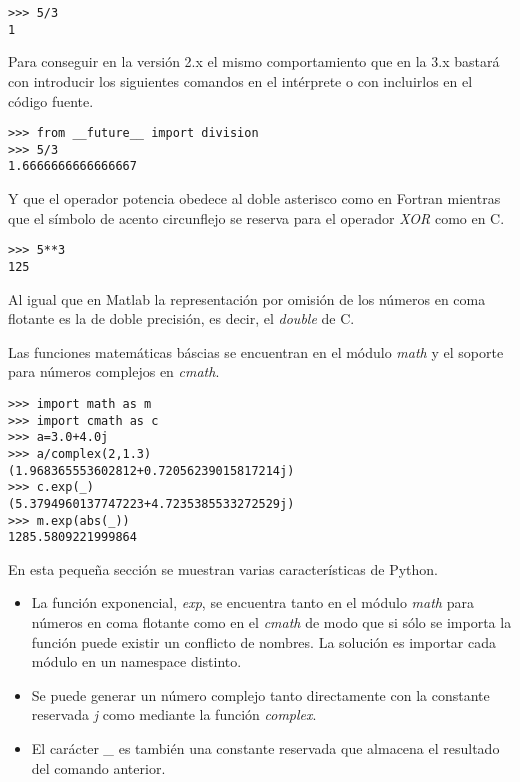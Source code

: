 \documentclass[a4paper,10pt]{article}
\begin{document}
\begin{lstlisting}
>>> 5/3
1
\end{lstlisting}

Para conseguir en la versión 2.x el mismo comportamiento que en la 3.x
bastará con introducir los siguientes comandos en el intérprete o con
incluirlos en el código fuente.

\begin{lstlisting}
>>> from __future__ import division
>>> 5/3
1.6666666666666667
\end{lstlisting}

Y que el operador potencia obedece al doble asterisco como en Fortran
mientras que el símbolo de acento circunflejo se reserva para el
operador \emph{XOR} como en C.

\begin{lstlisting}
>>> 5**3
125
\end{lstlisting}

Al igual que en Matlab la representación por omisión de los números en
coma flotante es la de doble precisión, es decir, el \emph{double} de
C.

Las funciones matemáticas báscias se encuentran en el módulo
\emph{math} y el soporte para números complejos en \emph{cmath}.

\begin{lstlisting}
>>> import math as m
>>> import cmath as c
>>> a=3.0+4.0j
>>> a/complex(2,1.3)
(1.968365553602812+0.72056239015817214j)
>>> c.exp(_)
(5.3794960137747223+4.7235385533272529j)
>>> m.exp(abs(_))
1285.5809221999864
\end{lstlisting}


En esta pequeña sección se muestran varias características de Python.

\begin{itemize}
\item La función exponencial, \emph{exp}, se encuentra tanto en el
  módulo \emph{math} para números en coma flotante como en el
  \emph{cmath} de modo que si sólo se importa la función puede existir
  un conflicto de nombres.  La solución es importar cada módulo en un
  namespace distinto.
\item Se puede generar un número complejo tanto directamente con la
  constante reservada \emph{j} como mediante la función \emph{complex}.
\item El carácter \emph{\_} es también una constante reservada que
  almacena el resultado del comando anterior.
\end{itemize}
\end{document}

